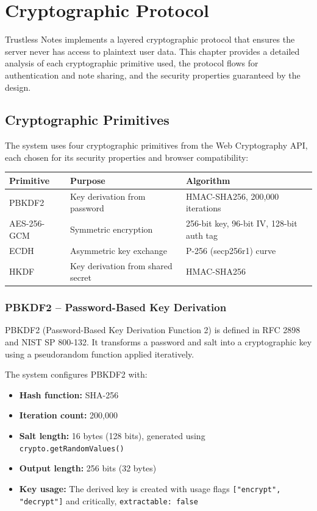 
\chapter{Cryptographic Protocol}

Trustless Notes implements a layered cryptographic protocol that ensures the server never has access to plaintext user data. This chapter provides a detailed analysis of each cryptographic primitive used, the protocol flows for authentication and note sharing, and the security properties guaranteed by the design.

\section{Cryptographic Primitives}

The system uses four cryptographic primitives from the Web Cryptography API, each chosen for its security properties and browser compatibility:

\begin{tabular}{lll}
\toprule
\textbf{Primitive} & \textbf{Purpose} & \textbf{Algorithm} \\
\midrule
PBKDF2 & Key derivation from password & HMAC-SHA256, 200,000 iterations \\
AES-256-GCM & Symmetric encryption & 256-bit key, 96-bit IV, 128-bit auth tag \\
ECDH & Asymmetric key exchange & P-256 (secp256r1) curve \\
HKDF & Key derivation from shared secret & HMAC-SHA256 \\
\bottomrule
\end{tabular}

\subsection{PBKDF2 -- Password-Based Key Derivation}

PBKDF2 (Password-Based Key Derivation Function 2) is defined in RFC 2898 and NIST SP 800-132. It transforms a password and salt into a cryptographic key using a pseudorandom function applied iteratively.

The system configures PBKDF2 with:
\begin{itemize}
    \item \textbf{Hash function:} SHA-256
    \item \textbf{Iteration count:} 200,000
    \item \textbf{Salt length:} 16 bytes (128 bits), generated using \texttt{crypto.getRandomValues()}
    \item \textbf{Output length:} 256 bits (32 bytes)
    \item \textbf{Key usage:} The derived key is created with usage flags \texttt{["encrypt", "decrypt"]} and critically, \texttt{extractable: false}
\end{itemize}


